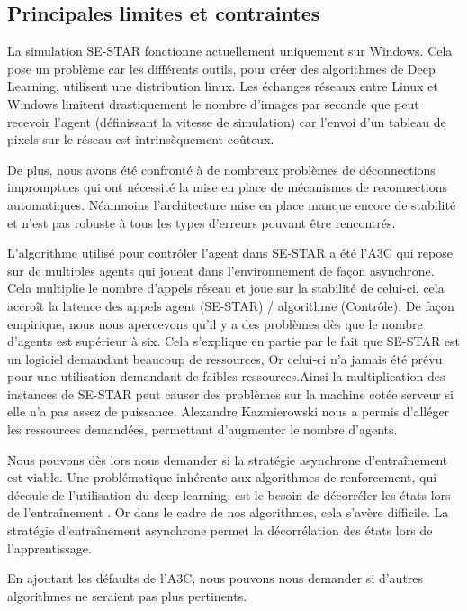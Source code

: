 \subsection{Principales limites et contraintes}

La simulation SE-STAR fonctionne actuellement uniquement sur Windows. Cela pose un problème car les différents outils, pour créer des algorithmes de Deep Learning, utilisent une distribution linux. Les échanges réseaux entre Linux et Windows limitent drastiquement le nombre d'images par seconde que peut recevoir l'agent (définissant la vitesse de simulation) car l'envoi d'un tableau de pixels sur le réseau est intrinsèquement coûteux. 

De plus, nous avons été confronté à de nombreux problèmes de déconnections impromptues qui ont nécessité la mise en place de mécanismes de reconnections automatiques. Néanmoins l'architecture mise en place manque encore de stabilité et n'est pas robuste à tous les types d'erreurs pouvant être rencontrés.

L'algorithme utilisé pour contrôler l'agent dans SE-STAR a été l'\gls{A3C} qui repose sur de multiples agents qui jouent dans l'environnement de façon asynchrone. Cela multiplie le nombre d'appels réseau et joue sur la stabilité de celui-ci, cela accroît la latence des appels agent (SE-STAR) / algorithme (Contrôle). De façon empirique, nous nous apercevons qu'il y a des problèmes dès que le nombre d'agents est supérieur à six. Cela s'explique en partie par le fait que SE-STAR est un logiciel demandant beaucoup de ressources, Or celui-ci n'a jamais été prévu pour une utilisation demandant de faibles ressources.Ainsi la multiplication des instances de SE-STAR peut causer des problèmes sur la machine cotée serveur si elle n'a pas assez de puissance. Alexandre  Kazmierowski nous a permis d'alléger les ressources demandées, permettant d'augmenter le nombre d'agents.

Nous pouvons dès lors nous demander si la stratégie asynchrone d'entraînement est viable.
Une problématique inhérente aux algorithmes de renforcement, qui découle de l'utilisation du deep learning, est le besoin de décorréler les états lors de l'entraînement . Or dans le cadre de nos algorithmes, cela s'avère difficile. La stratégie d'entraînement asynchrone permet la décorrélation des états lors de l'apprentissage.


En ajoutant les défaults de l'A3C, nous pouvons nous demander si d'autres algorithmes ne seraient pas plus pertinents.

